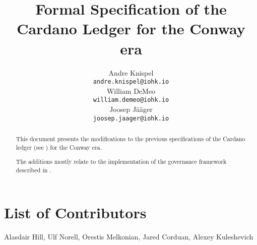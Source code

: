 \documentclass[11pt,a4paper,dvipsnames]{article}
\begin{document}
\title{Formal Specification of the Cardano Ledger for the Conway era}

\author{
   Andre Knispel \\ {\small \texttt{andre.knispel@iohk.io}} \\
   William DeMeo \\ {\small \texttt{william.demeo@iohk.io}} \\
   Joosep Jääger \\ {\small \texttt{joosep.jaager@iohk.io}} \\
   }

\date{}

\maketitle

\begin{abstract}
  This document presents the modifications to the previous
  specifications of the Cardano ledger (see
  \cite{cardano_shelley_spec,cardano_shelley_ma_spec,cardano_alonzo_spec,cardano_babbage_spec})
  for the Conway era.

  The additions mostly relate to the implementation of the governance
  framework described in \cite{cip1694}.
\end{abstract}

\section*{List of Contributors}
\label{acknowledgements}

Alasdair Hill, Ulf Norell, Orestis Melkonian, Jared Corduan, Alexey Kuleshevich

\tableofcontents



















\clearpage

\appendix




\end{document}
